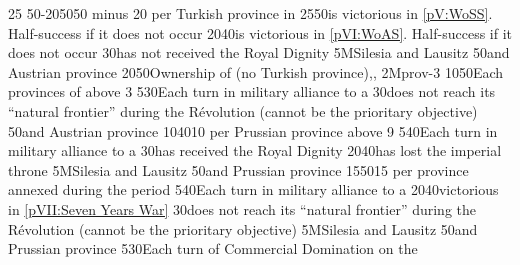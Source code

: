 {}{25}{}%
%
%
%
{50-20}{50}{50 \VPs minus 20 \VPs per Turkish province in \payshongrie}%
%
%
{25}{50}{\AUS is victorious in \ref{pV:WoSS}. Half-success if it does not
  occur}%
%
%
{20}{40}{\AUS is victorious in \ref{pVI:WoAS}. Half-success if it does not
  occur}%
%
%
{}{30}{\paysmajeurPrusse has not received the Royal Dignity}%
%
\EUobjective5M{Silesia and Lausitz}{}%
{}{50}{\provinceSilesie and \provinceLausitz Austrian province}%
%
%
%
{20}{50}{Ownership of \payshongrie (no Turkish
  province),\provinceBosna,\provinceSerbia}%
%
\EUobjective2M{\paysnaples}{prov-3}%
{10}{50}{Each provinces of \paysnaples above 3}%
%
%
{5}{30}{Each turn in military alliance to a \MAJ}%
%
%
{}{30}{\paysmajeurFrance does not reach its ``natural frontier'' during the
  Révolution (cannot be the prioritary objective)}%
%
%
{}{50}{\provinceSilesie and \provinceLausitz Austrian province}%
%
 
%
%
{10}{40}{10 \VPs per Prussian province above 9}%
%
%
{5}{40}{Each turn in military alliance to a \MAJ}%
%
%
{}{30}{\paysmajeurPrusse has received the Royal Dignity}%
%
%
{20}{40}{\AUS has lost the imperial throne}%
%
\EUobjective5M{Silesia and Lausitz}{}%
{}{50}{\provinceSilesie and \provinceLausitz Prussian province}%
%
%
%
{15}{50}{15 \VPs per province annexed during the period}%
%
%
{5}{40}{Each turn in military alliance to a \MAJ}%
%
%
{20}{40}{\PRU victorious in \ref{pVII:Seven Years War}}%
%
%
{}{30}{\paysmajeurFrance does not reach its ``natural frontier'' during the
  Révolution (cannot be the prioritary objective)}%
%
\EUobjective5M{Silesia and Lausitz}{}%
{}{50}{\provinceSilesie and \provinceLausitz Prussian province}%
%
 
%
%
{5}{30}{Each turn of Commercial Domination on the }%
